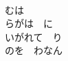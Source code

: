 \documentclass[10pt,b5j]{tarticle} %
\begin{document}
\begin{enumerate}
\begin{minipage}[c]{\blocksize}
        \vspace{\linespace}
        \item~\\
        むは　\\
        らがは　に\\
        いがれて　り\\
        のを　わなん
    
    \end{minipage}
\end{enumerate} %
\end{document}
